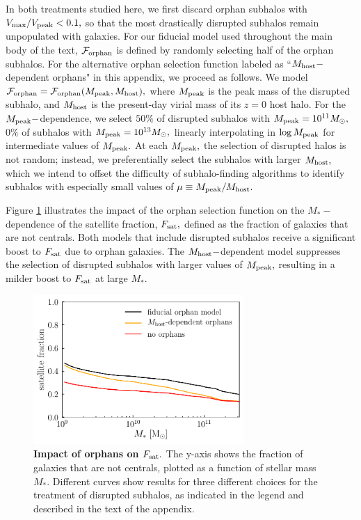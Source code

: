 \documentclass[usenatbib,usegraphicx,letterpaper]{mn2e}
\newcommand{\mstar}{M_{\ast}}
\newcommand{\fsat}{F_{\rm sat}}
\newcommand{\mpeak}{M_{\rm peak}}
\newcommand{\mhost}{M_{\rm host}}
\newcommand{\msun}{M_\odot}
\begin{document}
In both treatments studied here, we first discard orphan subhalos with $V_{\rm max}/V_{\rm peak}<0.1,$ so that the most drastically disrupted subhalos remain unpopulated with galaxies. For our fiducial model used throughout the main body of the text, $\mathcal{F}_{\rm orphan}$ is defined by randomly selecting half of the orphan subhalos. For the alternative orphan selection function labeled as ``$M_{\rm host}-$dependent orphans" in this appendix, we proceed as follows. We model $\mathcal{F}_{\rm orphan}=\mathcal{F}_{\rm orphan}(M_{\rm peak},M_{\rm host}),$ where $\mpeak$ is the peak mass of the disrupted subhalo, and $\mhost$ is the present-day virial mass of its $z=0$ host halo. For the $\mpeak-$dependence, we select $50\%$ of disrupted subhalos with $\mpeak=10^{11}\msun,$ $0\%$ of subhalos with $\mpeak=10^{13}\msun,$ linearly interpolating in $\log\mpeak$ for intermediate values of $\mpeak.$ At each $\mpeak,$ the selection of disrupted halos is not random; instead, we preferentially select the subhalos with larger $\mhost,$ which we intend to offset the difficulty of subhalo-finding algorithms to identify subhalos with especially small values of  $\mu\equiv\mpeak/\mhost.$

Figure \ref{fig:orphan_satellite_fractions} illustrates the impact of the orphan selection function on the $\mstar-$dependence of the satellite fraction, $\fsat,$ defined as the fraction of galaxies that are not centrals. Both models that include disrupted subhalos receive a significant boost to $\fsat$ due to orphan galaxies. The $\mhost-$dependent model suppresses the selection of disrupted subhalos with larger values of $\mpeak,$ resulting in a milder boost to $\fsat$ at large $\mstar.$ 

\begin{figure}
\centering
\includegraphics[width=8cm]{FIGS/orphan_satellite_fraction.pdf}
\caption{
{\bf Impact of orphans on $\fsat.$} The y-axis shows the fraction of galaxies that are not centrals, plotted as a function of stellar mass $\mstar.$ Different curves show results for three different choices for the treatment of disrupted subhalos, as indicated in the legend and described in the text of the appendix. 
}
\label{fig:orphan_satellite_fractions}
\end{figure}
\end{document}
